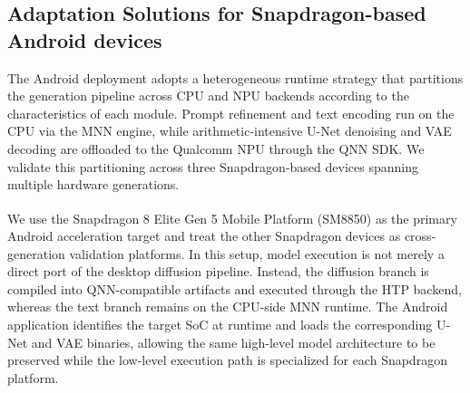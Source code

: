 \subsection{Adaptation Solutions for Snapdragon-based Android devices}

The Android deployment adopts a heterogeneous runtime strategy that partitions the generation pipeline across CPU and NPU backends according to the characteristics of each module. Prompt refinement and text encoding run on the CPU via the MNN engine, while arithmetic-intensive U-Net denoising and VAE decoding are offloaded to the Qualcomm NPU through the QNN SDK. We validate this partitioning across three Snapdragon-based devices spanning multiple hardware generations.

We use the Snapdragon\textsuperscript{\textregistered} 8 Elite Gen 5
Mobile Platform (SM8850) as the primary Android acceleration target and
treat the other Snapdragon devices as cross-generation validation platforms.
In this setup, model execution is not merely a direct port of the desktop
diffusion pipeline. Instead, the diffusion branch is compiled into
QNN-compatible artifacts and executed through the HTP backend, whereas
the text branch remains on the CPU-side MNN runtime. The Android application
identifies the target SoC at runtime and loads the corresponding U-Net and
VAE binaries, allowing the same high-level model architecture to be preserved
while the low-level execution path is specialized for each Snapdragon platform.

